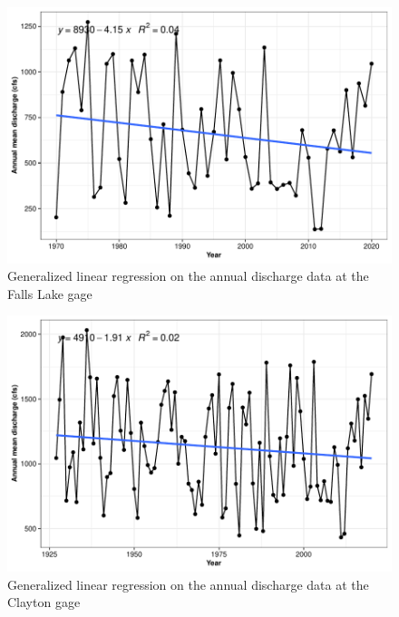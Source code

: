 \documentclass[
  12pt,
]{article}
\begin{document}
\begin{figure}

\includegraphics{Gardner_Zeng_ENV872_Project_files/figure-latex/GLM Falls Lake-1} \hfill{}

\caption{Generalized linear regression on the annual discharge data at the Falls Lake gage}\label{fig:GLM Falls Lake}
\end{figure}

\begin{figure}

\includegraphics{Gardner_Zeng_ENV872_Project_files/figure-latex/GLM Clayton-1} \hfill{}

\caption{Generalized linear regression on the annual discharge data at the Clayton gage}\label{fig:GLM Clayton}
\end{figure}
\end{document}
